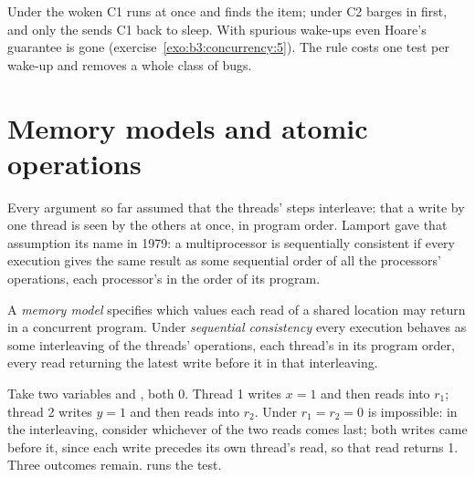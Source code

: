 \label{out:b3:concurrency:sim}

Under  the woken C1 runs at once and finds the item; under  C2 barges in first, and only the  sends C1 back to sleep. With spurious wake-ups even Hoare's guarantee is gone (exercise~\ref{exo:b3:concurrency:5}). The rule costs one test per wake-up and removes a whole class of bugs.

\section{Memory models and atomic operations}\label{sec:b3:concurrency:memory}

Every argument so far assumed that the threads' steps interleave: that a write by one thread is seen by the others at once, in program order. Lamport gave that assumption its name in 1979: a multiprocessor is sequentially consistent if every execution gives the same result as some sequential order of all the processors' operations, each processor's in the order of its program. %

\begin{definition}\label{def:b3:concurrency:memory-model}
A \emph{memory model} specifies which values each read of a shared location may return in a concurrent program. Under \emph{sequential consistency} every execution behaves as some interleaving of the threads' operations, each thread's in its program order, every read returning the latest write before it in that interleaving.
\end{definition}

Take two variables  and , both 0. Thread 1 writes $x = 1$ and then reads  into $r_1$; thread 2 writes $y = 1$ and then reads  into $r_2$. Under  $r_1 = r_2 = 0$ is impossible: in the interleaving, consider whichever of the two reads comes last; both writes came before it, since each write precedes its own thread's read, so that read returns 1. Three outcomes remain.  runs the test.


